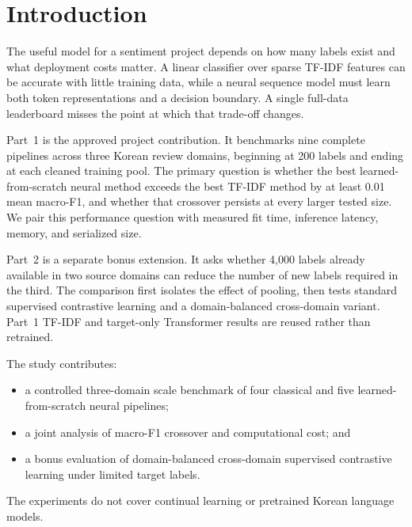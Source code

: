 \section{Introduction}

The useful model for a sentiment project depends on how many labels exist and what deployment costs matter. A linear classifier over sparse TF-IDF features can be accurate with little training data, while a neural sequence model must learn both token representations and a decision boundary. A single full-data leaderboard misses the point at which that trade-off changes.

Part~1 is the approved project contribution. It benchmarks nine complete pipelines across three Korean review domains, beginning at 200 labels and ending at each cleaned training pool. The primary question is whether the best learned-from-scratch neural method exceeds the best TF-IDF method by at least 0.01 mean macro-F1, and whether that crossover persists at every larger tested size. We pair this performance question with measured fit time, inference latency, memory, and serialized size.

Part~2 is a separate bonus extension. It asks whether 4,000 labels already available in two source domains can reduce the number of new labels required in the third. The comparison first isolates the effect of pooling, then tests standard supervised contrastive learning and a domain-balanced cross-domain variant. Part~1 TF-IDF and target-only Transformer results are reused rather than retrained.

The study contributes:
\begin{itemize}
  \item a controlled three-domain scale benchmark of four classical and five learned-from-scratch neural pipelines;
  \item a joint analysis of macro-F1 crossover and computational cost; and
  \item a bonus evaluation of domain-balanced cross-domain supervised contrastive learning under limited target labels.
\end{itemize}
The experiments do not cover continual learning or pretrained Korean language models.
